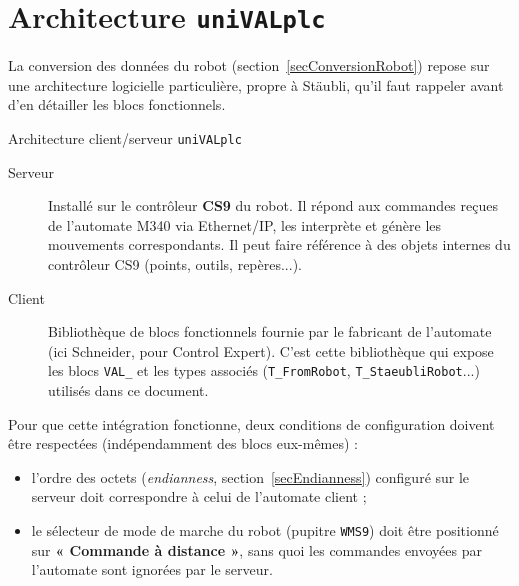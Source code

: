 \section{Architecture \texttt{uniVALplc}}
\label{secUnivalplcIntro}

La conversion des données du robot (section~\ref{secConversionRobot})
repose sur une architecture logicielle particulière, propre à Stäubli,
qu'il faut rappeler avant d'en détailler les blocs fonctionnels.

\begin{UPSTIinfor}{Architecture client/serveur \texttt{uniVALplc}}
\begin{description}
    \item[Serveur] Installé sur le contrôleur \textbf{CS9} du robot. Il
    répond aux commandes reçues de l'automate M340 via Ethernet/IP, les
    interprète et génère les mouvements correspondants. Il peut faire
    référence à des objets internes du contrôleur CS9 (points, outils,
    repères...).
    \item[Client] Bibliothèque de blocs fonctionnels fournie par le
    fabricant de l'automate (ici Schneider, pour Control Expert). C'est
    cette bibliothèque qui expose les blocs \texttt{VAL\_} et les types
    associés (\texttt{T\_FromRobot}, \texttt{T\_StaeubliRobot}...)
    utilisés dans ce document.
\end{description}
\end{UPSTIinfor}

Pour que cette intégration fonctionne, deux conditions de configuration
doivent être respectées (indépendamment des blocs eux-mêmes) :

\begin{itemize}
    \item l'ordre des octets (\emph{endianness}, section~\ref{secEndianness})
    configuré sur le serveur doit correspondre à celui de l'automate
    client ;
    \item le sélecteur de mode de marche du robot (pupitre \texttt{WMS9})
    doit être positionné sur \textbf{« Commande à distance »}, sans quoi
    les commandes envoyées par l'automate sont ignorées par le serveur.
\end{itemize}

